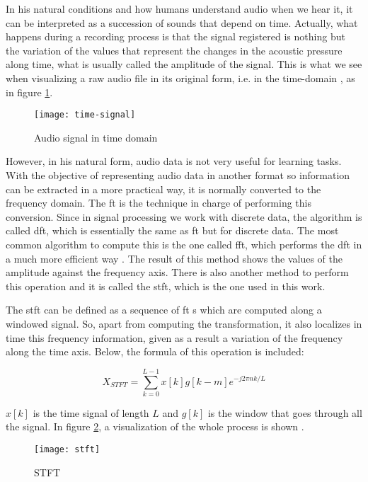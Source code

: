 	In his natural conditions and how humans understand audio when we hear it, it can be interpreted as a succession of sounds that depend on time. Actually, what happens during a recording process is that the signal registered is nothing but the variation of the values that represent the changes in the acoustic pressure along time, what is usually called the amplitude of the signal. This is what we see when visualizing a raw audio file in its original form, i.e. in the time-domain \cite{Laskaris2019}, as in figure \ref{fig:mesh49}.
	
	\begin{figure}[H]
		\centering
		\captionsetup{justification=centering}
		\texttt{[image: time-signal]}
		\caption{Audio signal in time domain}
		\label{fig:mesh49}
	\end{figure}

	However, in his natural form, audio data is not very useful for learning tasks. With the objective of representing audio data in another format so information can be extracted in a more practical way, it is normally converted to the frequency domain. The \acrshort{ft} is the technique in charge of performing this conversion. Since in signal processing we work with discrete data, the algorithm is called \acrfull{dft}, which is essentially the same as \acrshort{ft} but for discrete data. The most common algorithm to compute this is the one called \acrfull{fft}, which performs the \acrshort{dft} in a much more efficient way \cite{Lei2016}. The result of this method shows the values of the amplitude against the frequency axis. There is also another method to perform this operation and it is called the \acrfull{stft}, which is the one used in this work.
	
	The \acrshort{stft} can be defined as a sequence of \acrshort{ft} s which are computed along a windowed signal. So, apart from computing the transformation, it also localizes in time this frequency information, given as a result a variation of the frequency along the time axis. Below, the formula of this operation is included:
	
	\[ X_{STFT} =  \sum_{k=0}^{L-1} x[k]g[k-m]e^{-j2\pi n k/L}\]
	
	$x[k]$ is the time signal of length $L$ and $g[k]$ is the window that goes through all the signal. In figure \ref{fig:mesh50}, a visualization of the whole process is shown \cite{Kehtarnavaz2008}.
	
	\begin{figure}[H]
		\centering
		\captionsetup{justification=centering}
		\texttt{[image: stft]}
		\caption{STFT \cite{Gao2006}}
		\label{fig:mesh50}
	\end{figure}

